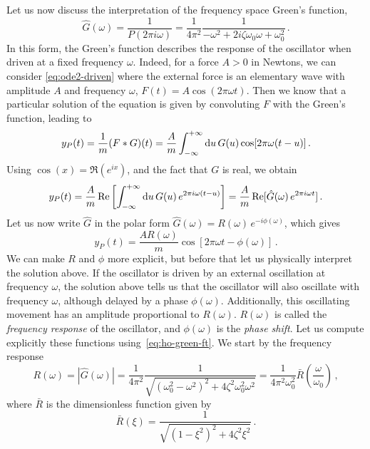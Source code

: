 Let us now discuss the interpretation of the frequency space Green's function, \ie
\begin{equation}
  \hat{G}(\omega)=\frac{1}{P(2\pi i\omega)}=\frac{1}{4\pi^2}
  \frac{1}{-\omega^2+2i\zeta\omega_0\omega+\omega_0^2}\,.
  \label{eq:ho-green-ft}
\end{equation}
In this form, the Green's function describes the response of the oscillator when driven at
a fixed frequency $\omega$. Indeed, for a force $A>0$ in Newtons, we can consider
\cref{eq:ode2-driven} where the external force is an elementary wave with amplitude $A$
and frequency $\omega$, \ie $F(t)=A\cos(2\pi\omega t)$. Then we know that a particular
solution of the equation is given by convoluting $F$ with the Green's function, leading to
\begin{equation}
  y_P(t)=\frac{1}{m}(F\ast G)(t)=\frac{A}{m}\int_{-\infty}^{+\infty}\mathrm{d}{u}\,G(u)\cos[2\pi\omega(t-u)]\,.
\end{equation}
Using $\cos(x)=\Re(e^{ix})$, and the fact that $G$ is real, we obtain
\begin{equation}
  y_P(t)=\frac{A}{m}\operatorname{Re}\left[\int_{-\infty}^{+\infty}\mathrm{d}{u}\,G(u)\,e^{2\pi i\omega(t-u)}\right]
  =\frac{A}{m}\operatorname{Re}[\hat{G}(\omega)\,e^{2\pi i\omega t}]\,.
\end{equation}
Let us now write $\hat{G}$ in the polar form
$\hat{G}(\omega)=R(\omega)\,e^{-i\phi(\omega)}$, which gives
\begin{equation}
  y_P(t)=\frac{AR(\omega)}{m}\cos[2\pi\omega t-\phi(\omega)]\,.
\end{equation}
We can make $R$ and $\phi$ more explicit, but before that let us physically interpret the
solution above. If the oscillator is driven by an external oscillation at frequency
$\omega$, the solution above tells us that the oscillator will also oscillate with
frequency $\omega$, although delayed by a phase $\phi(\omega)$. Additionally, this
oscillating movement has an amplitude proportional to $R(\omega)$. $R(\omega)$ is called
the \emph{frequency response} of the oscillator, and $\phi(\omega)$ is the \emph{phase
shift}. Let us compute explicitly these functions using~\cref{eq:ho-green-ft}. We start by
the frequency response
\begin{equation}
  R(\omega)=|\hat{G}(\omega)|=\frac{1}{4\pi^2}
  \frac{1}{\sqrt{(\omega_0^2-\omega^2)^2+4\zeta^2\omega_0^2\omega^2}}
  =\frac{1}{4\pi^2\omega_0^2}\bar{R}\left(\frac{\omega}{\omega_0}\right)\,,
\end{equation}
where $\bar{R}$ is the dimensionless function given by
\begin{equation}
  \bar{R}(\xi)=\frac{1}{\sqrt{(1-\xi^2)^2+4\zeta^2\xi^2}}\,.
  \label{eq:ho-response}
\end{equation}
